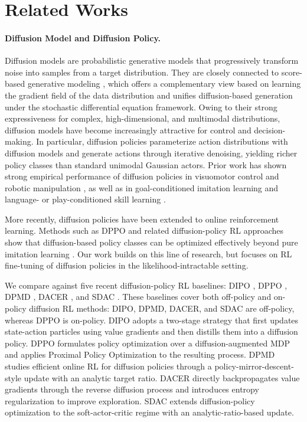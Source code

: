 \section{Related Works}
\label{sec:related_works}


\paragraph{Diffusion Model and Diffusion Policy.}
Diffusion models \cite{sohldickstein2015deep,ho2020denoising} are probabilistic generative models that progressively transform noise into samples from a target distribution. They are closely connected to score-based generative modeling \cite{song2019generative,song2021scorebased}, which offers a complementary view based on learning the gradient field of the data distribution and unifies diffusion-based generation under the stochastic differential equation framework. Owing to their strong expressiveness for complex, high-dimensional, and multimodal distributions, diffusion models have become increasingly attractive for control and decision-making. In particular, diffusion policies parameterize action distributions with diffusion models and generate actions through iterative denoising, yielding richer policy classes than standard unimodal Gaussian actors. Prior work has shown strong empirical performance of diffusion policies in visuomotor control and robotic manipulation \cite{chi2025diffusion}, as well as in goal-conditioned imitation learning and language- or play-conditioned skill learning \cite{reuss2023goalconditionedimitationlearningusing,chen2023playfusionskillacquisitiondiffusion}.

More recently, diffusion policies have been extended to online reinforcement learning. Methods such as DPPO and related diffusion-policy RL approaches show that diffusion-based policy classes can be optimized effectively beyond pure imitation learning \cite{ren2024diffusion,ma2025efficient}. Our work builds on this line of research, but focuses on RL fine-tuning of diffusion policies in the likelihood-intractable setting.

We compare against five recent diffusion-policy RL baselines: DIPO \cite{yang2023policyrepresentationdiffusionprobability}, DPPO \cite{ren2024diffusion}, DPMD \cite{ma2025efficient}, DACER \cite{wang2024diffusionactorcriticentropyregulator}, and SDAC \cite{ma2025efficient}. These baselines cover both off-policy and on-policy diffusion RL methods: DIPO, DPMD, DACER, and SDAC are off-policy, whereas DPPO is on-policy. DIPO adopts a two-stage strategy that first updates state-action particles using value gradients and then distills them into a diffusion policy. 
DPPO formulates policy optimization over a diffusion-augmented MDP and applies Proximal Policy Optimization to the resulting process. 
DPMD studies efficient online RL for diffusion policies through a policy-mirror-descent-style update with an analytic target ratio. DACER directly backpropagates value gradients through the reverse diffusion process and introduces entropy regularization to improve exploration. SDAC extends diffusion-policy optimization to the soft-actor-critic regime with an analytic-ratio-based update. 

